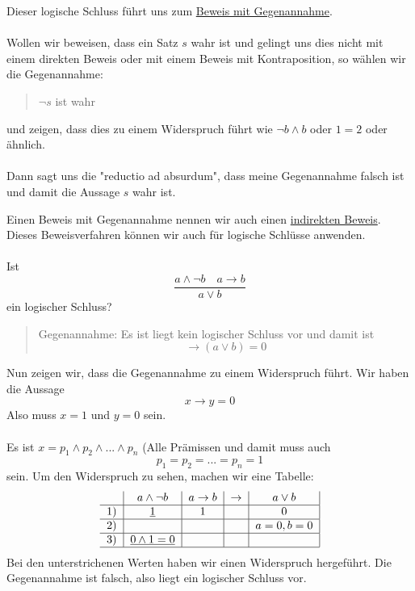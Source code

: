 \documentclass{report}
\begin{document}
\begin{enumerate}
Dieser logische Schluss führt uns zum \underline{Beweis mit Gegenannahme}.\\\\
Wollen wir beweisen, dass ein Satz $s$ wahr ist und gelingt uns dies nicht mit einem direkten Beweis oder mit einem Beweis mit Kontraposition, so wählen wir die Gegenannahme:
\begin{quote}$\lnot s$ ist wahr\end{quote}
und zeigen, dass dies zu einem Widerspruch führt wie $\lnot b \land b$ oder $1 = 2$ oder ähnlich.\\\\
Dann sagt uns die "reductio ad absurdum", dass meine Gegenannahme falsch ist und damit die Aussage $s$ wahr ist.\end{enumerate}
Einen Beweis mit Gegenannahme nennen wir auch einen \underline{indirekten Beweis}. Dieses Beweisverfahren können wir auch für logische Schlüsse anwenden.\\\\
Ist
\begin{equation}\frac{a \land \lnot b \quad a \to b}{a \lor b}\end{equation}
ein logischer Schluss?
\begin{quote}Gegenannahme: Es ist liegt kein logischer Schluss vor und damit ist
\begin{equation}[(a \land \lnot b) \land (a \to b)] \to (a \lor b) = 0\end{equation}\end{quote}
Nun zeigen wir, dass die Gegenannahme zu einem Widerspruch führt. Wir haben die Aussage
\begin{equation}x \to y = 0 \nonumber\end{equation}
Also muss $x=1$ und $y=0$ sein.\\\\
Es ist $x = p_1 \land p_2 \land ... \land p_n$ (Alle Prämissen und damit muss auch
\begin{equation}p_1 = p_2 = ... = p_n = 1 \nonumber \end{equation}
sein. Um den Widerspruch zu sehen, machen wir eine Tabelle:
\begin{equation}\begin{tabular}{c | c | c | c | c |}
& $a \land \lnot b$ & $a \to b$ & $\to$ & $a \lor b$ \\ \hline
1) & \underline{1} & 1 & & 0 \\ \hline
2) & & & & $a=0, b=0$ \\ \hline
3) &\underline{$0 \land 1 = 0$} & & & \\ \hline
\end{tabular}\end{equation}Bei den unterstrichenen Werten haben wir einen Widerspruch hergeführt. Die Gegenannahme ist falsch, also liegt ein logischer Schluss vor.
\end{document}
